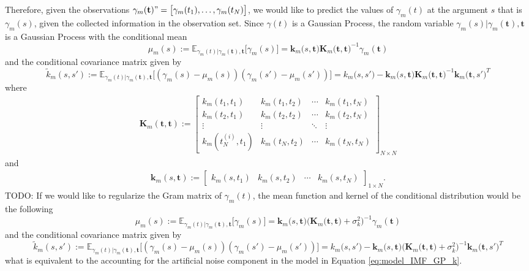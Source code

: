 Therefore, given the observations $\gamma_m(\mathbf{t}) "= \big[ \gamma_m(t_1), \ldots, \gamma_m(t_N) \big]$, we would like to predict the values of $\gamma_m(t)$ at the argument $s$ that is $\gamma_m(s)$, given the collected information in the observation set. Since $\gamma(t)$ is a Gaussian Process, the random variable $\gamma_m(s)| \gamma_m(\mathbf{t}), \mathbf{t}$ is a Gaussian Process with the conditional mean
\begin{equation*}
\mu_m(s):=\mathbb{E}_{\gamma_m(t)|\gamma_m(\mathbf{t}), \mathbf{t}} \big[\gamma_m(s) \big] =  \mathbf{k}_m \big(s,\mathbf{t}\big) \mathbf{K}_m \big(\mathbf{t},\mathbf{t}\big)^{-1} \gamma_m(\mathbf{t})
\end{equation*}
and the conditional covariance matrix given by
\begin{equation*}
\tilde{k}_m(s,s'):= \mathbb{E}_{\gamma_m(t)|\gamma_m(\mathbf{t}), \mathbf{t}} \bigg[(\gamma_m(s) - \mu_m(s))(\gamma_m(s') - \mu_m(s'))\bigg] = k_m \big(s,s'\big) - \mathbf{k}_m\big(s,\mathbf{t}\big) \mathbf{K}_m \big(\mathbf{t},\mathbf{t}\big)^{-1} \mathbf{k}_m \big(\mathbf{t},s'\big) ^T
\end{equation*}
where
\begin{align*}
\mathbf{K}_m (\mathbf{t},\mathbf{t}) := \begin{bmatrix}
k_m(t_1,t_1) & k_m(t_1,t_2)& \cdots & k_m(t_1,t_{N}) \\
k_m(t_2,t_1) & k_m(t_2,t_2)& \cdots & k_m(t_2,t_{N}) \\
\vdots & \vdots & \ddots & \vdots  \\
k_m(t_{N}^{(i)},t_1) & k_m(t_{N},t_2)& \cdots & k_m(t_{N},t_{N})
\end{bmatrix}_{ N \times N}
\end{align*}
and
\begin{align*}
\mathbf{k}_m (s,\mathbf{t}) := \begin{bmatrix}
k_m(s,t_1) & k_m(s,t_2)& \cdots & k_m(s,t_{N})
\end{bmatrix}_{ 1 \times N}.
\end{align*}
{\color{red} TODO:
If we would like to regularize the Gram matrix of $\gamma_m(t)$, the mean function and kernel of the conditional distribution would be the following
\begin{equation*}
\mu_m(s):=\mathbb{E}_{\gamma_m(t)|\gamma_m(\mathbf{t}), \mathbf{t}} \big[\gamma_m(s) \big] =  \mathbf{k}_m \big(s,\mathbf{t}\big) \Big( \mathbf{K}_m \big(\mathbf{t},\mathbf{t}\big) + \sigma^2_k \Big)^{-1} \gamma_m(\mathbf{t})
\end{equation*}
and the conditional covariance matrix given by
\begin{equation*}
\tilde{k}_m(s,s'):= \mathbb{E}_{\gamma_m(t)|\gamma_m(\mathbf{t}), \mathbf{t}} \bigg[(\gamma_m(s) - \mu_m(s))(\gamma_m(s') - \mu_m(s'))\bigg] = k_m \big(s,s'\big) - \mathbf{k}_m\big(s,\mathbf{t}\big) \Big( \mathbf{K}_m \big(\mathbf{t},\mathbf{t}\big) + \sigma_k^2 \Big)^{-1} \mathbf{k}_m \big(\mathbf{t},s'\big) ^T
\end{equation*}
what is equivalent to the accounting for the artificial noise component in the model in Equation \eqref{eq:model_IMF_GP_k}.}

